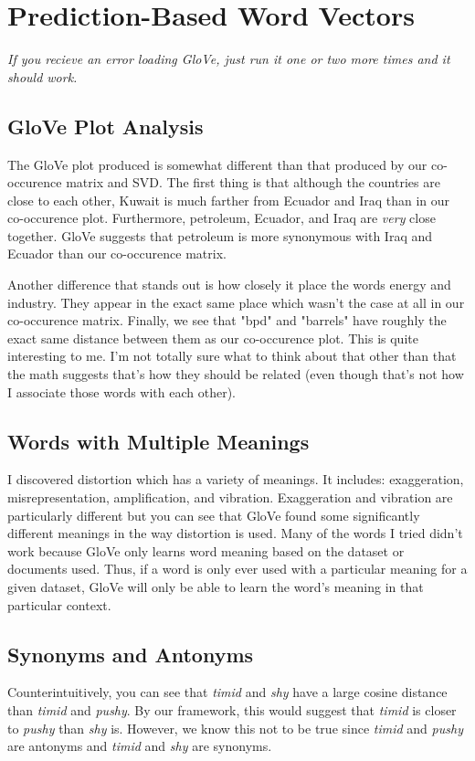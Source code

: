 \documentclass[12pt]{article}
\begin{document}
\section{Prediction-Based Word Vectors}

\emph{If you recieve an error loading GloVe, just run it one or two more times and it should work.}

\subsection{GloVe Plot Analysis}
The GloVe plot produced is somewhat different than that produced by our co-occurence
matrix and SVD. The first thing is that although the countries are close to each other, 
Kuwait is much farther from Ecuador and Iraq than in our co-occurence plot. Furthermore, petroleum, 
Ecuador, and Iraq are \emph{very} close together. GloVe suggests that petroleum is more synonymous 
with Iraq and Ecuador than our co-occurence matrix. 

Another difference that stands out is how closely it place the words energy and industry. They appear 
in the exact same place which wasn't the case at all in our co-occurence matrix. Finally, we see that 
"bpd" and "barrels" have roughly the exact same distance between them as our co-occurence plot. This
is quite interesting to me. I'm not totally sure what to think about that other than that the math 
suggests that's how they should be related (even though that's not how I associate 
those words with each other).

\subsection{Words with Multiple Meanings}
I discovered distortion which has a variety of meanings. It includes: exaggeration, misrepresentation, 
amplification, and vibration. Exaggeration and vibration are particularly different but you can see 
that GloVe found some significantly different meanings in the way distortion is used. Many of the words
I tried didn't work because GloVe only learns word meaning based on the dataset or documents used. 
Thus, if a word is only ever used with a particular meaning for a given dataset, GloVe will only be 
able to learn the word's meaning in that particular context.

\subsection{Synonyms and Antonyms}
Counterintuitively, you can see that \emph{timid} and \emph{shy} have a large cosine distance than 
\emph{timid} and \emph{pushy}. By our framework, this would suggest that \emph{timid} is closer to 
\emph{pushy} than \emph{shy} is. However, we know this not to be true since \emph{timid} and \emph{pushy}
are antonyms and \emph{timid} and \emph{shy} are synonyms. 
\end{document}
